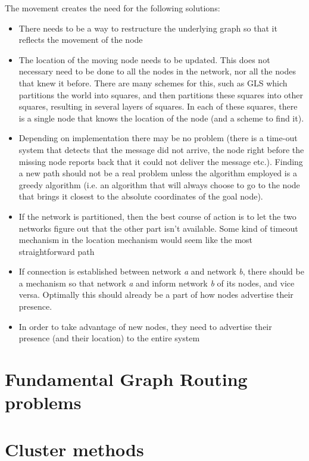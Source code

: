 \documentclass[letter, 12pt, english, draft]{article}
\begin{document}
The movement creates the need for the following solutions:
\begin{itemize}
\item There needs to be a way to restructure the underlying graph so that it reflects the movement of the node \cite{practical}
\item The location of the moving node needs to be updated. This does not necessary need to be done to all the nodes in the network, nor all the nodes that knew it before. There are many schemes for this, such as GLS \cite{scaleLocation} which partitions the world into squares, and then partitions these squares into other squares, resulting in several layers of squares. In each of these squares, there is a single node that knows the location of the node (and a scheme to find it).
\item Depending on implementation there may be no problem (there is a time-out system that detects that the message did not arrive, the node right before the missing node reports back that it could not deliver the message etc.). Finding a new path should not be a real problem unless the algorithm employed is a greedy algorithm (i.e. an algorithm that will always choose to go to the node that brings it closest to the absolute coordinates of the goal node).
\item If the network is partitioned, then the best course of action is to let the two networks figure out that the other part isn't available. Some kind of timeout mechanism in the location mechanism would seem like the most straightforward path
\item If connection is established between network \emph{a} and network \emph{b}, there should be a mechanism so that network \emph{a} and inform network \emph{b} of its nodes, and vice versa. Optimally this should already be a part of how nodes advertise their presence.
\item In order to take advantage of new nodes, they need to advertise their presence (and their location) to the entire system 
\end{itemize}

\section{Fundamental Graph Routing problems}



\section{Cluster methods}
\end{document}
